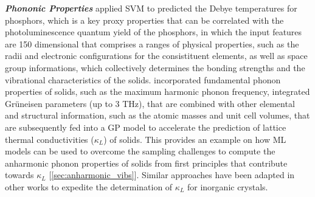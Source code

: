 \textbf{\textit{Phononic Properties}} \citet{zhuo2018identifying} applied SVM to predicted the Debye temperatures for phosphors, which is a key proxy properties that can be correlated with the photoluminescence quantum yield of the phosphors, in which the input features are 150 dimensional that comprises a ranges of physical properties, such as the  radii and electronic configurations for the consistituent elements, as well as space group informations, which collectively determines the bonding strengths and the vibrational characteristics of the solids. \citet{juneja2019coupling} incorporated fundamental phonon properties of solids, such as the maximum harmonic phonon frequency, integrated Gr\"{u}neisen parameters (up to 3 THz), that are combined with other elemental and structural information, such as the atomic masses and unit cell volumes, that are subsequently fed into a GP model to accelerate the prediction of lattice thermal conductivities ($\kappa_L$) of solids. This provides an example on how ML models can be used to overcome the sampling challenges to compute the anharmonic phonon properties of solids from first principles that contribute towards $\kappa_L$ [\cref{sec:anharmonic_vibs}]. Similar approaches have been adapted in other works to expedite the determination of $\kappa_L$ for inorganic crystals.\cite{chen2019machine,jaafreh2021lattice}


